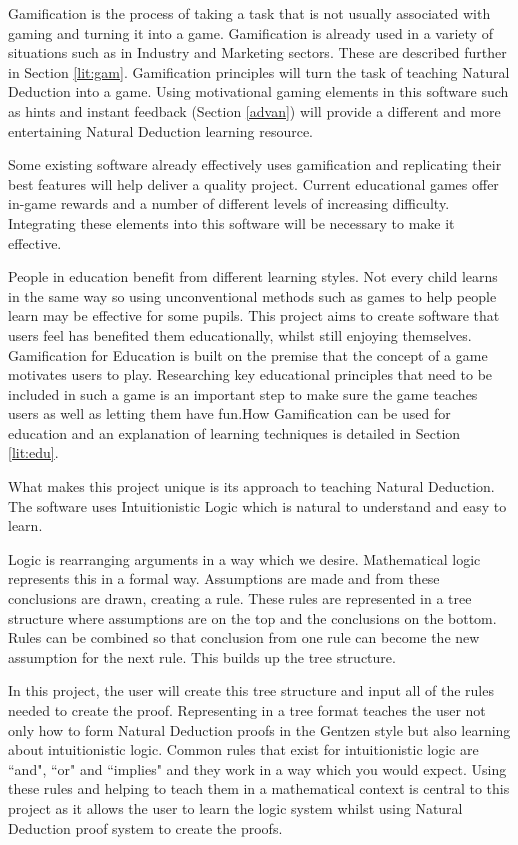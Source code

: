 \documentclass[FYP.tex]{subfiles}
\begin{document}
Gamification is the process of taking a task that is not usually associated with gaming and turning it into a game. Gamification is already used in a variety of situations such as in Industry and Marketing sectors. These are described further in Section \ref{lit:gam}. Gamification principles will turn the task of teaching Natural Deduction into a game. Using motivational gaming elements in this software such as hints and instant feedback (Section \ref{advan}) will provide a different and more entertaining Natural Deduction learning resource. 

Some existing software already effectively uses gamification and replicating their best features will help deliver a quality project. Current educational games offer in-game rewards and a number of different levels of increasing difficulty. Integrating these elements into this software will be necessary to make it effective.

People in education benefit from different learning styles. Not every child learns in the same way so using unconventional methods such as games to help people learn may be effective for some pupils. This project aims to create software that users feel has benefited them educationally, whilst still enjoying themselves. Gamification for Education is built on the premise that the concept of a game motivates users to play. Researching key educational principles that need to be included in such a game is an important step to make sure the game teaches users as well as letting them have fun.How Gamification can be used for education and an explanation of learning techniques is detailed in Section \ref{lit:edu}. 


What makes this project unique is its approach to teaching Natural Deduction. The software uses Intuitionistic Logic which is natural to understand and easy to learn.

Logic is rearranging arguments in a way which we desire. Mathematical logic represents this in a formal way. Assumptions are made and from these conclusions are drawn, creating a rule. These rules are represented in a tree structure where assumptions are on the top and the conclusions on the bottom. Rules can be combined so that conclusion from one rule can become the new assumption for the next rule. This builds up the tree structure. 

In this project, the user will create this tree structure and input all of the rules needed to create the proof. Representing in a tree format teaches the user not only how to form Natural Deduction proofs in the Gentzen style but also learning about intuitionistic logic. Common rules that exist for intuitionistic logic are ``and", ``or" and ``implies" and they work in a way which you would expect. Using these rules and helping to teach them in a mathematical context is central to this project as it allows the user to learn the logic system whilst using Natural Deduction proof system to create the proofs. 
\end{document}
